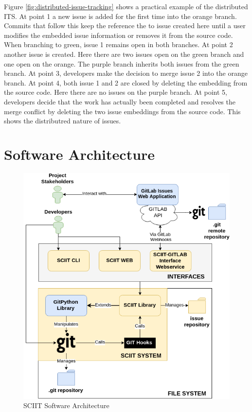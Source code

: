 \documentclass{mproj}
\begin{document}
Figure \ref{fig:distributed-issue-tracking} shows a practical example of the distributed ITS. At point 1 a new issue is added for the first time into the orange branch. Commits that follow this keep the reference the to issue created here until a user modifies the embedded issue information or removes it from the source code. When branching to green, issue 1 remains open in both branches. At point 2 another issue is created. Here there are two issues open on the green branch and one open on the orange. The purple branch inherits both issues from the green branch. At point 3, developers make the decision to merge issue 2 into the orange branch. At point 4, both issue 1 and 2 are closed by deleting the embedding from the source code. Here there are no issues on the purple branch. At point 5, developers decide that the work has actually been completed and resolves the merge conflict by deleting the two issue embeddings from the source code. This shows the distributred nature of issues.







\section{Software Architecture}

\begin{figure}[t]
\caption{SCIIT Software Architecture}
\label{fig:sciit-software-arch}
\centering
\includegraphics[width=12cm]{sciit-software-arch}
\end{figure}
\end{document}
